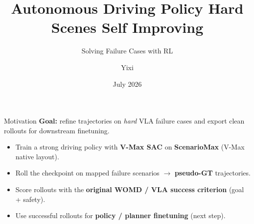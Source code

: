 \documentclass[aspectratio=169,11pt]{beamer}
\title{Autonomous Driving Policy Hard Scenes Self Improving}
\subtitle{\small Solving Failure Cases with RL}
\author{Yixi}
\date{July 2026}
\begin{document}
\begin{frame}
  \titlepage
\end{frame}

\begin{frame}{Motivation}
  \textbf{Goal:} refine trajectories on \emph{hard} VLA failure cases and export clean rollouts for downstream finetuning.

  \vspace{0.6em}
  \begin{itemize}
    \item Train a strong driving policy with \textbf{V-Max SAC} on \textbf{ScenarioMax} (V-Max native layout).
    \item Roll the checkpoint on mapped failure scenarios $\rightarrow$ \textbf{pseudo-GT} trajectories.
    \item Score rollouts with the \textbf{original WOMD / VLA success criterion} (goal + safety).
    \item Use successful rollouts for \textbf{policy / planner finetuning} (next step).
  \end{itemize}
\end{frame}
\end{document}
